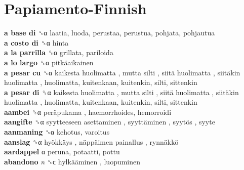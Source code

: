 \twocolumn
\chapter{Papiamento-Finnish}
\small
\raggedright
{}\textbf{a base di} ␝α  laatia, luoda, perustaa, perustua, pohjata, pohjautua  \\
\textbf{a costo di} ␝α  hinta  \\
\textbf{a la parrilla} ␝α  grillata, pariloida  \\
\textbf{a lo largo} ␝α   pitkäaikainen   \\
\textbf{a pesar cu} ␝α   kaikesta huolimatta ,  mutta silti ,  siitä huolimatta ,  siitäkin huolimatta , huolimatta, kuitenkaan, kuitenkin, silti, sittenkin  \\
\textbf{a pesar di} ␝α   kaikesta huolimatta ,  mutta silti ,  siitä huolimatta ,  siitäkin huolimatta , huolimatta, kuitenkaan, kuitenkin, silti, sittenkin  \\
\textbf{aambei} ␝α   peräpukama , haemorrhoides, hemorroidi  \\
\textbf{aangifte} ␝α   syytteeseen asettaminen ,  syyttäminen ,  syytös , syyte  \\
\textbf{aanmaning} ␝α  kehotus, varoitus  \\
\textbf{aanslag} ␝α   hyökkäys ,  näppäimen painallus ,  rynnäkkö   \\
\textbf{aardappel} α  peruna, potaatti, pottu  \\
\textbf{abandono} \emph{n}  ␝ϲ   hylkääminen , luopuminen  \\
